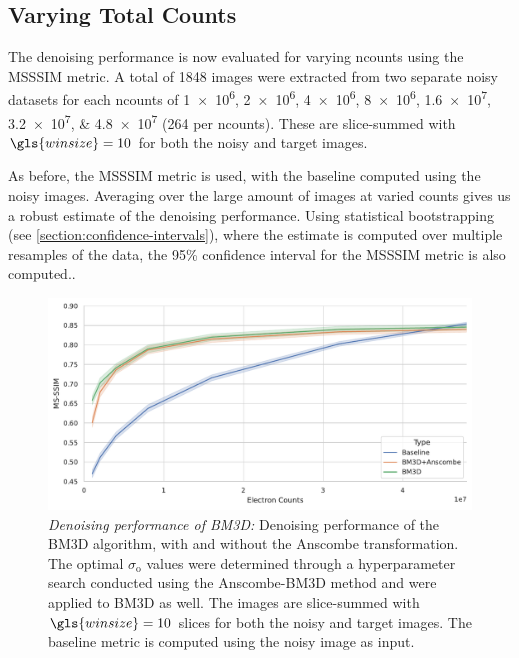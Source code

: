 
\subsection{Varying Total Counts}
The denoising performance is now evaluated for varying \gls{ncounts} using the \gls{MSSSIM} metric. A total of \num{1848} images were extracted from two separate noisy datasets for each \gls{ncounts} of \numlist{1e6;2e6;4e6;8e6;1.6e7;3.2e7;4.8e7} (\num{264} per \gls{ncounts}). These are slice-summed with $\gls{winsize}=10$ for both the noisy and target images. 

As before, the \gls{MSSSIM} metric is used, with the baseline computed using the noisy images. Averaging over the large amount of images at varied counts gives us a robust estimate of the denoising performance. Using statistical bootstrapping (see \cref{section:confidence-intervals}), where the estimate is computed over multiple resamples of the data, the \num{95}\% confidence interval for the \gls{MSSSIM} metric is also computed..

\begin{figure}
    \centering
    \includegraphics[width=1\linewidth]{images/bm3d_msssim.pdf}
    \caption{\textit{Denoising performance of BM3D:} Denoising performance of the \gls{BM3D} algorithm, with and without the Anscombe transformation. The optimal $\sigma_{\text{o}}$ values were determined through a hyperparameter search conducted using the Anscombe-BM3D method and were applied to BM3D as well. The images are slice-summed with $\gls{winsize}=10$ slices for both the noisy and target images. The baseline metric is computed using the noisy image as input.}
    \label{fig:bm3d-msssim}
\end{figure}


